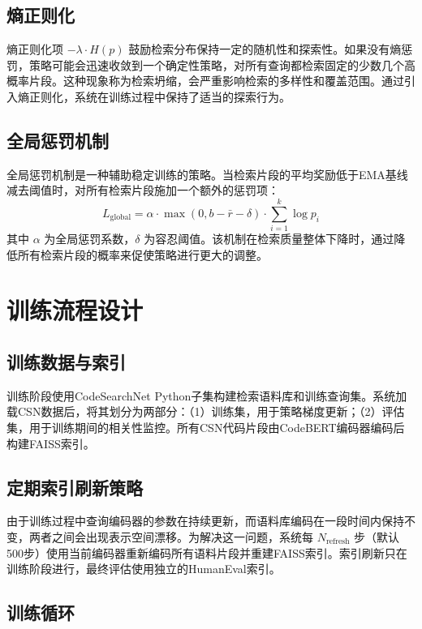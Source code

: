 \documentclass[
    fontset = win, %
  ]{njuthesis}
\begin{document}
\subsection{熵正则化}

熵正则化项 $- \lambda \cdot H(p)$ 鼓励检索分布保持一定的随机性和探索性。如果没有熵惩罚，策略可能会迅速收敛到一个确定性策略，对所有查询都检索固定的少数几个高概率片段。这种现象称为检索坍缩，会严重影响检索的多样性和覆盖范围。通过引入熵正则化，系统在训练过程中保持了适当的探索行为。

\subsection{全局惩罚机制}

全局惩罚机制是一种辅助稳定训练的策略。当检索片段的平均奖励低于EMA基线减去阈值时，对所有检索片段施加一个额外的惩罚项：
\[
L_{\text{global}} = \alpha \cdot \max(0, b - \bar{r} - \delta) \cdot \sum_{i=1}^k \log p_i
\]
其中 $\alpha$ 为全局惩罚系数，$\delta$ 为容忍阈值。该机制在检索质量整体下降时，通过降低所有检索片段的概率来促使策略进行更大的调整。

\section{训练流程设计}

\subsection{训练数据与索引}

训练阶段使用CodeSearchNet Python子集构建检索语料库和训练查询集。系统加载CSN数据后，将其划分为两部分：（1）训练集，用于策略梯度更新；（2）评估集，用于训练期间的相关性监控。所有CSN代码片段由CodeBERT编码器编码后构建FAISS索引。

\subsection{定期索引刷新策略}

由于训练过程中查询编码器的参数在持续更新，而语料库编码在一段时间内保持不变，两者之间会出现表示空间漂移。为解决这一问题，系统每 $N_{\text{refresh}}$ 步（默认500步）使用当前编码器重新编码所有语料片段并重建FAISS索引。索引刷新只在训练阶段进行，最终评估使用独立的HumanEval索引。

\subsection{训练循环}
\end{document}
